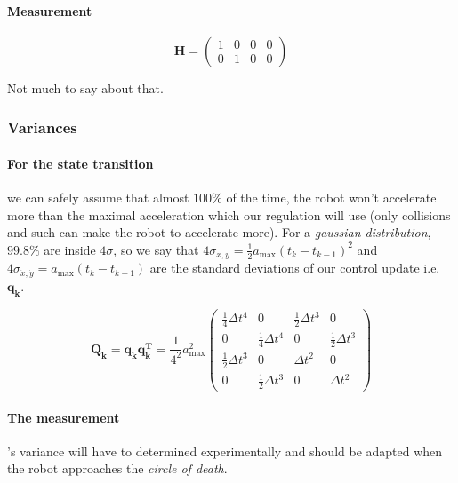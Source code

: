 \documentclass[a4paper, 12pt]{paper}
\begin{document}
\paragraph{Measurement}

\begin{equation}
    \mathbf{H} = \left( \begin{array}{cccc} 1 & 0 & 0 & 0\\
                                            0 & 1 & 0 & 0 \end{array} \right)
\label{eq:h}
\end{equation}

Not much to say about that.

\subsubsection{Variances}

\paragraph{For the state transition}
\label{pg:variance_state_trans}
we can safely assume that almost $100\%$ of the time, the robot
won't accelerate more than the maximal acceleration which our regulation will
use (only collisions and such can make the robot to accelerate more).
For a \emph{gaussian distribution}, $99.8\%$ are inside $4\sigma$, so we say
that $4\sigma_{x,y} = \frac{1}{2} a_{\max} {\left( t_k - t_{k-1} \right)}^2 $
and $4\sigma_{\dot{x},\dot{y}} = a_{\max} \left( t_k - t_{k-1} \right)$ are the
standard deviations of our control update i.e. $\mathbf{q_k}$.

\begin{equation}
    \mathbf{Q_k} = \mathbf{q_k q_k^T} =
        \frac{1}{4^2} a_{\max}^2 \left( \begin{array}{cccc}
         \frac{1}{4} \Delta t^4 & 0 & \frac{1}{2} \Delta t^3 & 0\\
        0 & \frac{1}{4} \Delta t^4 & 0 & \frac{1}{2} \Delta t^3\\
        \frac{1}{2} \Delta t^3 & 0 & \Delta t^2 & 0 \\
        0 & \frac{1}{2} \Delta t^3 & 0 & \Delta t^2 \end{array} \right)
\label{eq:q}
\end{equation}

\paragraph{The measurement}'s variance will have to determined experimentally
and should be adapted when the robot approaches the \emph{circle of death}.
\end{document}
